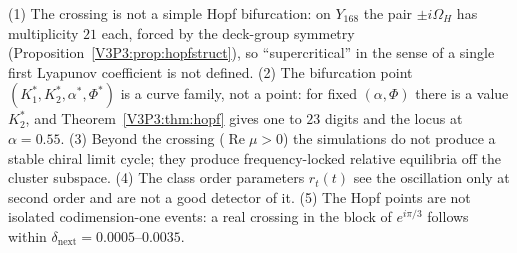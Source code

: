 \begin{remark}\label{V3P3:rem:hopfcorrections}
(1) The crossing is not a simple Hopf bifurcation: on $Y_{168}$ the pair $\pm i\Omega_H$ has
multiplicity $21$ each, forced by the deck-group symmetry (Proposition~\ref{V3P3:prop:hopfstruct}), so
``supercritical'' in the sense of a single first Lyapunov coefficient is not defined. (2) The
bifurcation point $(K_1^{*},K_2^{*},\alpha^{*},\Phi^{*})$ is a curve family, not a point: for fixed
$(\alpha,\Phi)$ there is a value $K_2^{*}$, and Theorem~\ref{V3P3:thm:hopf} gives one to $23$ digits
and the locus at $\alpha=0.55$. (3) Beyond the crossing ($\operatorname{Re}\mu>0$) the simulations do not
produce a stable chiral limit cycle; they produce frequency-locked relative equilibria off the cluster
subspace. (4) The class order parameters $r_t(t)$ see the oscillation only at second order and are
not a good detector of it. (5) The Hopf points are not isolated codimension-one events: a real
crossing in the block of $e^{i\pi/3}$ follows within $\delta_{\mathrm{next}}=0.0005$--$0.0035$.
\end{remark}
